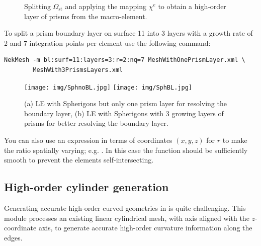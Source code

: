 \begin{figure}
  \begin{center}
  \end{center}
  \caption{Splitting $\Omega_{\text{st}}$ and applying the mapping $\chi^e$ to
    obtain a high-order layer of prisms from the macro-element.}
  \label{fig:util:mc:split}
\end{figure}

To split a prism boundary layer on surface 11 into 3 layers with a growth rate
of 2 and 7 integration points per element use the following command:
\begin{lstlisting}[style=BashInputStyle]
  NekMesh -m bl:surf=11:layers=3:r=2:nq=7 MeshWithOnePrismLayer.xml \
        MeshWith3PrismsLayers.xml
\end{lstlisting}
%
\begin{figure}[!htbp]
  \begin{center}
    \texttt{[image: img/SphnoBL.jpg]}
    \texttt{[image: img/SphBL.jpg]}
    \caption{(a) LE with Spherigons but only one prism layer for resolving the
      boundary layer, (b) LE with Spherigons with 3 growing layers of prisms for
      better resolving the boundary layer.}
  \end{center}
\end{figure}

\begin{notebox}
  You can also use an expression in terms of coordinates $(x,y,z)$ for $r$ to
  make the ratio spatially varying; e.g. \inltt{r=sin(x)}. In this case the
  function should be sufficiently smooth to prevent the elements
  self-intersecting.
\end{notebox}

\subsection{High-order cylinder generation}

Generating accurate high-order curved geometries in \gmsh is quite challenging.
This module processes an existing linear cylindrical mesh, with axis aligned
with the $z$-coordinate axis, to generate accurate high-order curvature
information along the edges.

